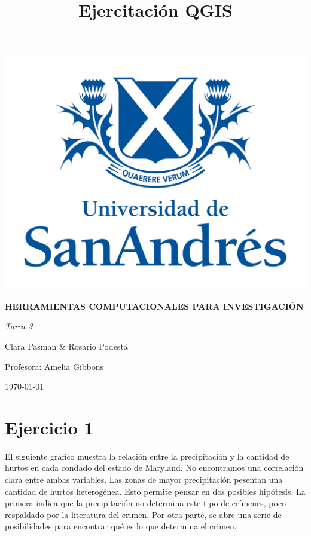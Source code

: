 \documentclass[12pt, spanish]{article}
\begin{document}
\title{Ejercitación QGIS}


\thispagestyle{empty}
\begin{center}
\includegraphics[width=15cm]{Universidad_San_Andres_UdeSA.jpg}
\end{center}

	\begin{center}
	\LARGE
\textbf{HERRAMIENTAS COMPUTACIONALES PARA INVESTIGACIÓN}
	

	\vspace{1.5 cm}
	\LARGE
	\textit{Tarea 3}

	\vspace{1 cm}
	\Large
	Clara Pasman \& Rosario Podestá\
	
	\vspace{1.3cm}
	\Large	
	Profesora: Amelia Gibbons\

	
	\vspace{1 cm}
	\normalsize
	\today
	\end{center}
	
\clearpage

\section{Ejercicio 1}
El siguiente gráfico muestra la relación entre la precipitación y la cantidad de hurtos en cada condado del estado de Maryland. No encontramos una correlación clara entre ambas variables. Las zonas de mayor precipitación pesentan una cantidad de hurtos heterogénea. Esto permite pensar en dos posibles hipótesis. La primera indica que la precipitación no determina este tipo de crímenes, poco respaldado por la literatura del crimen. Por otra parte, se abre una serie de posibilidades para encontrar qué es lo que determina el crimen. 
\end{document}
